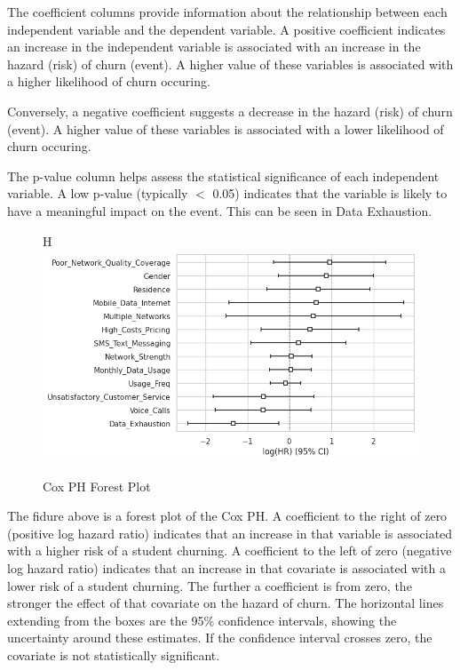 \documentclass[doublespacing]{report} %
\begin{document}
The coefficient columns provide information about the relationship between each independent variable and the dependent variable. A positive coefficient indicates an increase in the independent variable is associated with an increase in the hazard (risk) of churn (event). A higher value of these variables is associated with a higher likelihood of churn occuring. 

Conversely, a negative coefficient suggests a decrease in the hazard (risk) of churn (event). A higher value of these variables is associated with a lower likelihood of churn occuring.

The p-value column helps assess the statistical significance of each independent variable. A low p-value (typically  \(<\) 0.05) indicates that the variable is likely to have a meaningful impact on the event. This can be seen in Data Exhaustion.

\begin{figure}{H}
    \centering
    \includegraphics[width=1\linewidth]{Figure 4/4.2.png}
    \caption{Cox PH Forest Plot}
\end{figure}

The fidure above is a forest plot of the Cox PH. A coefficient to the right of zero (positive log hazard ratio) indicates that an increase in that variable is associated with a higher risk of a student churning. A coefficient to the left of zero (negative log hazard ratio) indicates that an increase in that covariate is associated with a lower risk of a student churning.
The further a coefficient is from zero, the stronger the effect of that covariate on the hazard of churn.
The horizontal lines extending from the boxes are the 95\% confidence intervals, showing the uncertainty around these estimates. If the confidence interval crosses zero, the covariate is not statistically significant.
\end{document}
